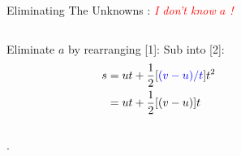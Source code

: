 \begin{frame}{ Eliminating The Unknowns  : \textit{\textcolor{red}{I don't know $a$ !} }}
\small


\begin{columns}[T]
\begin{column}{0.7\textwidth}
 Eliminate $a$ by rearranging [1]: %
Sub into [2]: 
\begin{equation}\nonumber
\begin{split}
s  &= ut + \frac{1}{2} [\textcolor{blue}{(v-u) / t}] t^2  \\
& = ut + \frac{1}{2} [(v-u)] t \\
\end{split}
\end{equation}
\end{column}\hfill

\begin{column}{0.3\textwidth}

        
 \\[1ex] 
 \\[3ex] 
\end{column}
\end{columns}
\vspace{0.5cm}

.  \\[1ex]

\end{frame}


